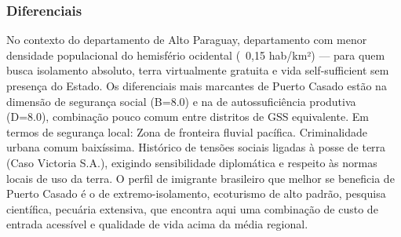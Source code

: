 \subsubsection*{Diferenciais}\label{dif-puerto-casado-1702}
No contexto do departamento de Alto Paraguay, departamento com menor densidade populacional do hemisfério ocidental (~0,15 hab/km²) — para quem busca isolamento absoluto, terra virtualmente gratuita e vida self-sufficient sem presença do Estado. Os diferenciais mais marcantes de Puerto Casado estão na dimensão de segurança social (B=8.0) e na de autossuficiência produtiva (D=8.0), combinação pouco comum entre distritos de GSS equivalente. Em termos de segurança local: Zona de fronteira fluvial pacífica. Criminalidade urbana comum baixíssima. Histórico de tensões sociais ligadas à posse de terra (Caso Victoria S.A.), exigindo sensibilidade diplomática e respeito às normas locais de uso da terra. O perfil de imigrante brasileiro que melhor se beneficia de Puerto Casado é o de extremo-isolamento, ecoturismo de alto padrão, pesquisa científica, pecuária extensiva, que encontra aqui uma combinação de custo de entrada acessível e qualidade de vida acima da média regional.
